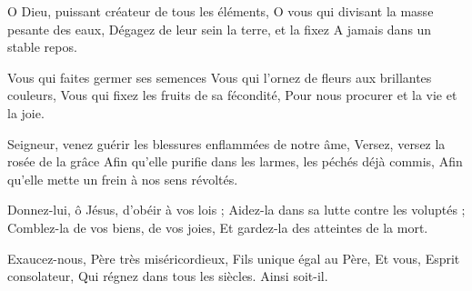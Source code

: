 O Dieu, puissant créateur de tous les éléments,
O vous qui divisant la masse pesante des eaux,
Dégagez de leur sein la terre, et la fixez
A jamais dans un stable repos.

Vous qui faites germer ses semences
Vous qui l'ornez de fleurs aux brillantes couleurs,
Vous qui fixez les fruits de sa fécondité,
Pour nous procurer et la vie et la joie.

Seigneur, venez guérir les blessures enflammées de notre âme,
Versez, versez la rosée de la grâce
Afin qu'elle purifie dans les larmes, les péchés déjà commis,
Afin qu'elle mette un frein à nos sens révoltés.

Donnez-lui, ô Jésus, d'obéir à vos lois ;
Aidez-la dans sa lutte contre les voluptés ;
Comblez-la de vos biens, de vos joies,
Et gardez-la des atteintes de la mort.

Exaucez-nous, Père très miséricordieux,
Fils unique égal au Père,
Et vous, Esprit consolateur,
Qui régnez dans tous les siècles.
Ainsi soit-il.